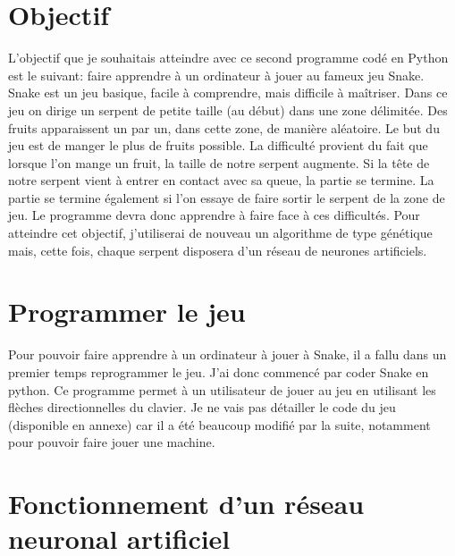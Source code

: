 \documentclass[12pt, a4paper, openany]{book}
\begin{document}
\section{Objectif}
L'objectif que je souhaitais atteindre avec ce second programme  codé en Python est le suivant: faire apprendre à un ordinateur à jouer au fameux jeu Snake. Snake est un jeu basique, facile à comprendre, mais difficile à maîtriser. Dans ce jeu on dirige un serpent de petite taille (au début) dans une zone délimitée. Des fruits apparaissent un par un, dans cette zone, de manière aléatoire. Le but du jeu est de manger le plus de fruits possible. La difficulté provient du fait que lorsque l'on mange un fruit, la taille de notre serpent augmente. Si la tête de notre serpent vient à entrer en contact avec sa queue, la partie se termine. La partie se termine également si l'on essaye de faire sortir le serpent de la zone de jeu.\newline
Le programme devra donc apprendre à faire face à ces difficultés. Pour atteindre cet objectif, j'utiliserai de nouveau un algorithme de type génétique mais, cette fois, chaque serpent disposera d'un réseau de neurones artificiels.

\section{Programmer le jeu}
\label{r:2.2}
Pour pouvoir faire apprendre à un ordinateur à jouer à Snake, il a fallu dans un premier temps reprogrammer le jeu. J'ai donc commencé par coder Snake en python. Ce programme permet à un utilisateur de jouer au jeu en utilisant les flèches directionnelles du clavier. Je ne vais pas détailler le code du jeu (disponible en annexe) car il a été beaucoup modifié par la suite, notamment pour pouvoir faire jouer une machine.

\section{Fonctionnement d'un réseau neuronal artificiel}
\label{r:2.3}
\end{document}
